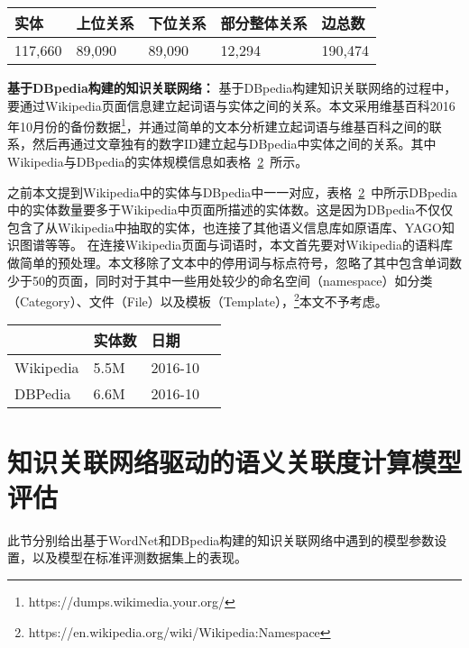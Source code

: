 \begin{table}[htbp]
    \center
    \vspace{5pt}
    \begin{tabular}{|p{1.6cm}|p{1.6cm}|p{1.6cm}|p{2.5cm}|p{1.6cm}|}
    \hline
    实体   & 上位关系 & 下位关系 & 部分整体关系 & 边总数   \\ \hline
    117,660   & 89,090 & 89,090 & 12,294 & 190,474    \\ \hline
    \end{tabular}
    \label{wordnet_data}
\end{table}

\textbf{基于DBpedia构建的知识关联网络：}
基于DBpedia构建知识关联网络的过程中，要通过Wikipedia页面信息建立起词语与实体之间的关系。本文采用维基百科2016年10月份的备份数据\footnote{https://dumps.wikimedia.your.org/}，并通过简单的文本分析建立起词语与维基百科之间的联系，然后再通过文章独有的数字ID建立起与DBpedia中实体之间的关系。其中Wikipedia与DBpedia的实体规模信息如表格~\ref{wiki_data}~所示。

之前本文提到Wikipedia中的实体与DBpedia中一一对应，表格~\ref{wiki_data}~中所示DBpedia中的实体数量要多于Wikipedia中页面所描述的实体数。这是因为DBpedia不仅仅包含了从Wikipedia中抽取的实体，也连接了其他语义信息库如原语库、YAGO知识图谱等等。
在连接Wikipedia页面与词语时，本文首先要对Wikipedia的语料库做简单的预处理。本文移除了文本中的停用词与标点符号，忽略了其中包含单词数少于50的页面，同时对于其中一些用处较少的命名空间（namespace）如分类（Category）、文件（File）以及模板（Template），\footnote{https://en.wikipedia.org/wiki/Wikipedia:Namespace}本文不予考虑。

\begin{table}[htbp]
    \center
    \vspace{5pt}
    \begin{tabular}{|p{2cm}|p{2cm}|p{2cm}|p{2cm}|}
    \hline
              & 实体数    & 日期        \\ \hline
    Wikipedia & 5.5M     & 2016-10     \\ \hline
    DBPedia   & 6.6M     & 2016-10     \\ \hline
    \end{tabular}
    \label{wiki_data}
\end{table}


\section{知识关联网络驱动的语义关联度计算模型评估}
此节分别给出基于WordNet和DBpedia构建的知识关联网络中遇到的模型参数设置，以及模型在标准评测数据集上的表现。

